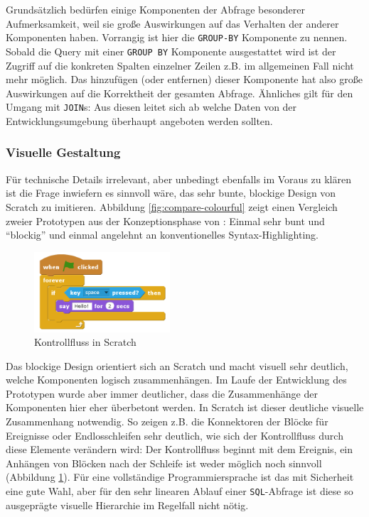 Grundsätzlich bedürfen einige Komponenten der Abfrage besonderer Aufmerksamkeit, weil sie große Auswirkungen auf das Verhalten der anderer Komponenten haben. Vorrangig ist hier die \texttt{GROUP-BY} Komponente zu nennen. Sobald die Query mit einer \texttt{GROUP BY} Komponente ausgestattet wird ist der Zugriff auf die konkreten Spalten einzelner Zeilen z.B. im allgemeinen Fall nicht mehr möglich. Das hinzufügen (oder entfernen) dieser Komponente hat also große Auswirkungen auf die Korrektheit der gesamten Abfrage. Ähnliches gilt für den Umgang mit \texttt{JOIN}s: Aus diesen leitet sich ab welche Daten von der Entwicklungsumgebung überhaupt angeboten werden sollten.

\subsubsection{Visuelle Gestaltung}

Für technische Details irrelevant, aber unbedingt ebenfalls im Voraus zu klären ist die Frage inwiefern es sinnvoll wäre, das sehr bunte, blockige Design von Scratch zu imitieren. Abbildung \ref{fig:compare-colourful} zeigt einen Vergleich zweier Prototypen aus der Konzeptionsphase von \idename{}: Einmal sehr bunt und ``blockig'' und einmal angelehnt an konventionelles Syntax-Highlighting.


\begin{figure}
  \includegraphics[width=0.45\textwidth]{images/scratch-control-flow}
  \caption{Kontrollfluss in Scratch}
  \label{fig:screen-scratch-control-flow}
\end{figure}

Das blockige Design orientiert sich an Scratch und macht visuell sehr deutlich, welche Komponenten logisch zusammenhängen. Im Laufe der Entwicklung des Prototypen wurde aber immer deutlicher, dass die Zusammenhänge der Komponenten hier eher überbetont werden. In Scratch ist dieser deutliche visuelle Zusammenhang notwendig. So zeigen z.B. die Konnektoren der Blöcke für Ereignisse oder Endlosschleifen sehr deutlich, wie sich der Kontrollfluss durch diese Elemente verändern wird: Der Kontrollfluss beginnt mit dem Ereignis, ein Anhängen von Blöcken nach der Schleife ist weder möglich noch sinnvoll (Abbildung \ref{fig:screen-scratch-control-flow}).  Für eine vollständige Programmiersprache ist das mit Sicherheit eine gute Wahl, aber für den sehr linearen Ablauf einer \texttt{SQL}-Abfrage ist diese so ausgeprägte visuelle Hierarchie im Regelfall nicht nötig.

